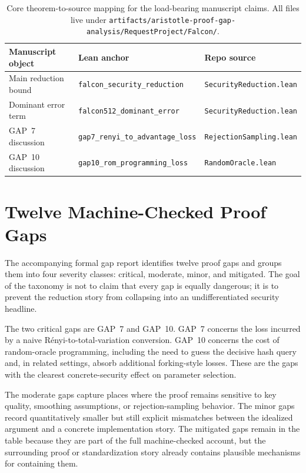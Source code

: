 \documentclass[11pt]{article}
\begin{document}
\begin{table}[t]
\centering
\small
\begin{tabular}{|l|l|l|}
\hline
\textbf{Manuscript object} & \textbf{Lean anchor} & \textbf{Repo source} \\
\hline
Main reduction bound & \texttt{falcon\_security\_reduction} & \texttt{SecurityReduction.lean} \\
\hline
Dominant error term & \texttt{falcon512\_dominant\_error} & \texttt{SecurityReduction.lean} \\
\hline
GAP~7 discussion & \texttt{gap7\_renyi\_to\_advantage\_loss} & \texttt{RejectionSampling.lean} \\
\hline
GAP~10 discussion & \texttt{gap10\_rom\_programming\_loss} & \texttt{RandomOracle.lean} \\
\hline
\end{tabular}
\caption{Core theorem-to-source mapping for the load-bearing manuscript claims. All files live under \texttt{artifacts/aristotle-proof-gap-analysis/RequestProject/Falcon/}.}
\label{tab:theorem-map}
\end{table}

\section{Twelve Machine-Checked Proof Gaps}

The accompanying formal gap report identifies twelve proof gaps and groups them into four severity classes: critical, moderate, minor, and mitigated. The goal of the taxonomy is not to claim that every gap is equally dangerous; it is to prevent the reduction story from collapsing into an undifferentiated security headline.



The two critical gaps are GAP~7 and GAP~10. GAP~7 concerns the loss incurred by a naive R\'{e}nyi-to-total-variation conversion. GAP~10 concerns the cost of random-oracle programming, including the need to guess the decisive hash query and, in related settings, absorb additional forking-style losses. These are the gaps with the clearest concrete-security effect on parameter selection.

The moderate gaps capture places where the proof remains sensitive to key quality, smoothing assumptions, or rejection-sampling behavior. The minor gaps record quantitatively smaller but still explicit mismatches between the idealized argument and a concrete implementation story. The mitigated gaps remain in the table because they are part of the full machine-checked account, but the surrounding proof or standardization story already contains plausible mechanisms for containing them.
\end{document}
